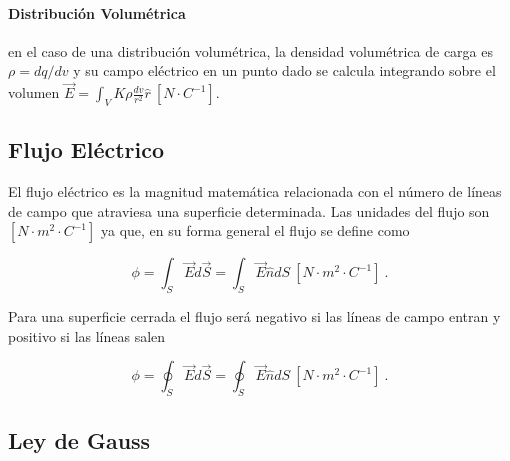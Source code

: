 \documentclass{tufte-handout}
\begin{document}
\paragraph{Distribución Volumétrica} en el caso de una distribución volumétrica, la densidad volumétrica de carga es $\rho = dq / dv$ y su campo eléctrico en un punto dado se calcula integrando sobre el volumen $\vec{E} = \int_V K\rho\frac{dv}{r^2}\hat{r}~[N\cdot C^{-1}]$.

\subsection{Flujo Eléctrico}

El flujo eléctrico es la magnitud matemática relacionada con el número de líneas de campo que atraviesa una superficie determinada. Las unidades del flujo son $[N\cdot m^2 \cdot C^{-1}]$ ya que, en su forma general el flujo se define como


\begin{equation}
\phi = \int_S \vec{E}d\vec{S} = \int_S \vec{E}\hat{n}dS~[N\cdot m^2 \cdot C^{-1}]~.
\end{equation}

Para una superficie cerrada el flujo será negativo si las líneas de campo entran y positivo si las líneas salen

\begin{equation}
\phi = \oint_S \vec{E}d\vec{S} = \oint_S \vec{E}\hat{n}dS~[N\cdot m^2 \cdot C^{-1}]~.
\end{equation}

\subsection{Ley de Gauss}
\end{document}
